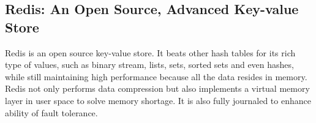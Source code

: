\subsection*{Redis: An Open Source, Advanced Key-value Store}
Redis\cite{redis} is an open source key-value store. It beats other hash
tables for its rich type of values, such as binary stream, lists, sets, sorted
sets and even hashes, while still maintaining high performance because all the
data resides in memory. Redis not only performs data compression but also
implements a virtual memory layer in user space to solve memory shortage. It
is also fully journaled to enhance ability of fault tolerance.
